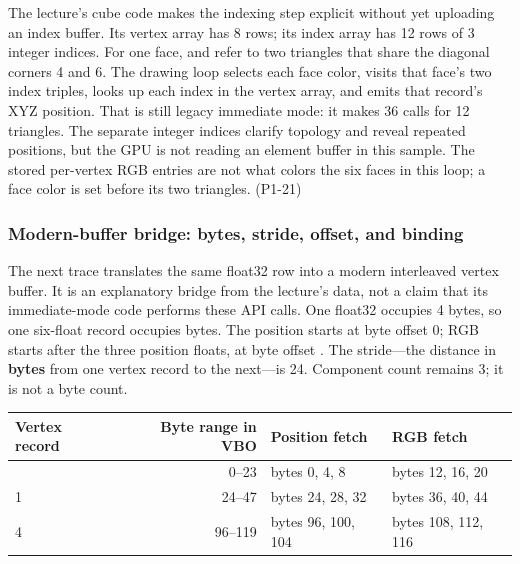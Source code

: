 The lecture's cube code makes the indexing step explicit without yet uploading an index buffer. Its vertex array has 8 rows; its index array has 12 rows of 3 integer indices. For one face, \BookInlineCode{{{[}}{4}{,}{5}{,}{6}{{]}}}{{[}4,5,6{]}} and \BookInlineCode{{{[}}{4}{,}{6}{,}{7}{{]}}}{{[}4,6,7{]}} refer to two triangles that share the diagonal corners 4 and 6. The drawing loop selects each face color, visits that face's two index triples, looks up each index in the vertex array, and emits that record's XYZ position. That is still legacy immediate mode: it makes 36  calls for 12 triangles. The separate integer indices clarify topology and reveal repeated positions, but the GPU is not reading an element buffer in this sample. The stored per-vertex RGB entries are not what colors the six faces in this loop; a face color is set before its two triangles. (P1-21)

\subsubsection{Modern-buffer bridge: bytes, stride, offset, and binding}\label{03-visual-computing-i-ch018-modern-buffer-bridge-bytes-stride-offset-and-binding}

\hypertarget{03-visual-computing-i-ch018-modern-buffer-bridge-bytes-stride-offset-and-binding}{}

The next trace translates the same  float32 row into a modern interleaved vertex buffer. It is an explanatory bridge from the lecture's data, not a claim that its immediate-mode code performs these API calls. One float32 occupies 4 bytes, so one six-float record occupies  bytes. The position starts at byte offset 0; RGB starts after the three position floats, at byte offset . The stride---the distance in \textbf{bytes} from one vertex record to the next---is 24. Component count remains 3; it is not a byte count.

{\def\LTcaptype{none} %
\begin{longtable}[]{@{}lrll@{}}
\toprule\noalign{}
Vertex record & Byte range in VBO & Position fetch & RGB fetch \\
\midrule\noalign{}
\endhead
\bottomrule\noalign{}
\endlastfoot
0 & 0--23 & bytes 0, 4, 8 & bytes 12, 16, 20 \\
1 & 24--47 & bytes 24, 28, 32 & bytes 36, 40, 44 \\
4 & 96--119 & bytes 96, 100, 104 & bytes 108, 112, 116 \\
\end{longtable}
}

